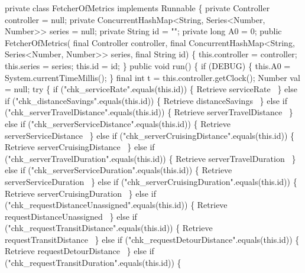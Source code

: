 \nwenddocs{}\plusendmoddef
private class FetcherOfMetrics implements Runnable \{
  private Controller controller = null;
  private ConcurrentHashMap<String, Series<Number, Number>> series = null;
  private String id = "";
  private long A0 = 0;
  public FetcherOfMetrics(
      final Controller controller,
      final ConcurrentHashMap<String, Series<Number, Number>> series,
      final String id) \{
    this.controller = controller;
    this.series = series;
    this.id = id;
  \}
  public void run() \{
    if (DEBUG) \{
      this.A0 = System.currentTimeMillis();
    \}
    final int t = this.controller.getClock();
    Number val = null;
    try \{
      if ("chk_serviceRate".equals(this.id)) \{
        \LA{}Retrieve serviceRate~{\nwtagstyle{}}\RA{}
      \} else if ("chk_distanceSavings".equals(this.id)) \{
        \LA{}Retrieve distanceSavings~{\nwtagstyle{}}\RA{}
      \} else if ("chk_serverTravelDistance".equals(this.id)) \{
        \LA{}Retrieve serverTravelDistance~{\nwtagstyle{}}\RA{}
      \} else if ("chk_serverServiceDistance".equals(this.id)) \{
        \LA{}Retrieve serverServiceDistance~{\nwtagstyle{}}\RA{}
      \} else if ("chk_serverCruisingDistance".equals(this.id)) \{
        \LA{}Retrieve serverCruisingDistance~{\nwtagstyle{}}\RA{}
      \} else if ("chk_serverTravelDuration".equals(this.id)) \{
        \LA{}Retrieve serverTravelDuration~{\nwtagstyle{}}\RA{}
      \} else if ("chk_serverServiceDuration".equals(this.id)) \{
        \LA{}Retrieve serverServiceDuration~{\nwtagstyle{}}\RA{}
      \} else if ("chk_serverCruisingDuration".equals(this.id)) \{
        \LA{}Retrieve serverCruisingDuration~{\nwtagstyle{}}\RA{}
      \} else if ("chk_requestDistanceUnassigned".equals(this.id)) \{
        \LA{}Retrieve requestDistanceUnassigned~{\nwtagstyle{}}\RA{}
      \} else if ("chk_requestTransitDistance".equals(this.id)) \{
        \LA{}Retrieve requestTransitDistance~{\nwtagstyle{}}\RA{}
      \} else if ("chk_requestDetourDistance".equals(this.id)) \{
        \LA{}Retrieve requestDetourDistance~{\nwtagstyle{}}\RA{}
      \} else if ("chk_requestTransitDuration".equals(this.id)) \{
